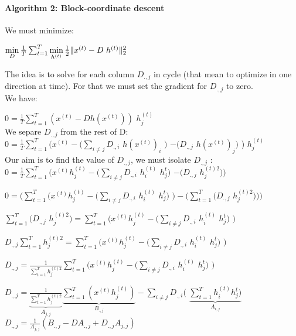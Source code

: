 \documentclass[a4paper,10pt]{article}
\begin{document}
\paragraph{Algorithm 2: Block-coordinate descent}
We must minimize:
\begin{center}
 $\min\limits_{D} \frac{1}{T} \sum_{t=1}^{T}  \min\limits_{h^{(t)}} \frac{1}{2} \| x^{(t)} - D \hspace{3px} h^{(t)} \|_2^2 $\\
\end{center}
The idea is to solve for each column $D_{., j}$ in cycle (that mean to optimize in one direction at time). For that we must set the gradient for $D_{., j}$ to zero.\\
We have:
\begin{center}
 $0 = \frac{1}{T}\sum_{t=1}^{T} (x^{(t)} - D h(x^{(t)}))$ $h^{(t)}_{j}$\\ \vspace{0.4cm}
 We separe $D_{.,j}$ from the rest of D:\\
 $0 = \frac{1}{T}\sum_{t=1}^{T} (x^{(t)} - (\sum_{i \neq j}D_{.,i}$ $h(x^{(t)})_i$ $ )$  $ - (D_{.,j}$ $h(x^{(t)})_j)$ ) $ h^{(t)}_{j}$\\ \vspace{0.4cm}
 Our aim is to find the value of $D_{.,j}$, we must isolate $D_{.,j}$ :\\
 $0 = \frac{1}{T} \sum_{t=1}^{T}(x^{(t)} h^{(t)}_{j} - (\sum_{i \neq j}D_{.,i}$ $h^{(t)}_i$ $h^{t}_{j} )$  $ - (D_{.,j}$ $h^{(t)2}_j))$\\ \vspace{0.2cm}
 
  $0 = (\sum_{t=1}^{T}(x^{(t)} h^{(t)}_{j} - (\sum_{i \neq j}D_{.,i}$ $h^{(t)}_i$ $h^{t}_{j} )$  $) - ( \sum_{t=1}^{T}( D_{.,j}$ $h^{(t)2}_j)))$\\ \vspace{0.2cm}
  
  $  \sum_{t=1}^{T}( D_{.,j}$ $h^{(t)2}_j) = \sum_{t=1}^{T}(x^{(t)} h^{(t)}_{j} - (\sum_{i \neq j}D_{.,i}$ $h^{(t)}_i$ $h^{t}_{j} )$  $) $\\  \vspace{0.2cm}
  
  $ D_{.,j}  \sum_{t=1}^{T} h^{(t)2}_j = \sum_{t=1}^{T}(x^{(t)} h^{(t)}_{j} - (\sum_{i \neq j}D_{.,i}$ $h^{(t)}_i$ $h^{t}_{j} )$  $) $\\ \vspace{0.2cm}
  
$ D_{.,j}  =\frac{1}{ \sum_{t=1}^{T} h^{(t)2}_j} \sum_{t=1}^{T}(x^{(t)} h^{(t)}_{j} - (\sum_{i \neq j}D_{.,i}$ $h^{(t)}_i$ $h^{t}_{j} )$  $) $\\ \vspace{0.2cm}

$ D_{.,j}  =\underbrace{\frac{1}{ \sum_{t=1}^{T} h^{(t)2}_j}}_{A_{j, j}} \underbrace{\sum_{t=1}^{T}(x^{(t)} h^{(t)}_{j})}_{B_{., j}}  - \sum_{i \neq j}D_{., i}($ $\underbrace{\sum_{t=1}^{T} h^{(t)}_i h^{t}_{j} ) }_{A_{i,j}}$\\ \vspace{0.2cm}
$D_{., j} = \frac{1}{A_{j, j}}(B_{., j} - D A_{., j} + D_{., j}A_{j, j})$
\end{center}  
\end{document}
